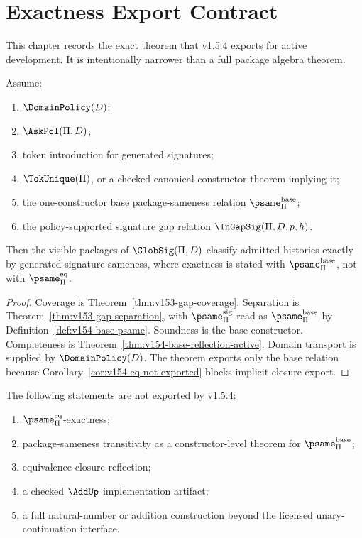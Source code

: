 
\chapter{Exactness Export Contract}
\label{ch:v154-exactness-export-contract}

This chapter records the exact theorem that v1.5.4 exports for active development. It is intentionally narrower than a full package algebra theorem.

\begin{theorem}
\label{thm:v154-exact-concrete-globalize}
Assume:
\begin{enumerate}
  \item \(\DomainPolicy(D)\);
  \item \(\AskPol(\Pi,D)\);
  \item token introduction for generated signatures;
  \item \(\TokUnique(\Pi)\), or a checked canonical-constructor theorem implying it;
  \item the one-constructor base package-sameness relation \(\psame_{\Pi}^{\mathrm{base}}\);
  \item the policy-supported signature gap relation \(\InGapSig(\Pi,D,p,h)\).
\end{enumerate}
Then the visible packages of \(\GlobSig(\Pi,D)\) classify admitted histories exactly by generated signature-sameness, where exactness is stated with \(\psame_{\Pi}^{\mathrm{base}}\), not with \(\psame_{\Pi}^{\mathrm{eq}}\).
\end{theorem}

\begin{proof}
Coverage is Theorem~\ref{thm:v153-gap-coverage}. Separation is Theorem~\ref{thm:v153-gap-separation}, with \(\psame_{\Pi}^{\mathrm{sig}}\) read as \(\psame_{\Pi}^{\mathrm{base}}\) by Definition~\ref{def:v154-base-psame}. Soundness is the base constructor. Completeness is Theorem~\ref{thm:v154-base-reflection-active}. Domain transport is supplied by \(\DomainPolicy(D)\). The theorem exports only the base relation because Corollary~\ref{cor:v154-eq-not-exported} blocks implicit closure export.
\end{proof}

\begin{proposition}
\label{prop:v154-not-exported}
The following statements are not exported by v1.5.4:
\begin{enumerate}
  \item \(\psame_{\Pi}^{\mathrm{eq}}\)-exactness;
  \item package-sameness transitivity as a constructor-level theorem for \(\psame_{\Pi}^{\mathrm{base}}\);
  \item equivalence-closure reflection;
  \item a checked \(\AddUp\) implementation artifact;
  \item a full natural-number or addition construction beyond the licensed unary-continuation interface.
\end{enumerate}
\end{proposition}

